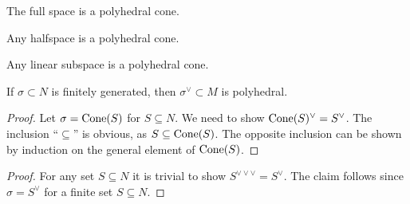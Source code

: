\begin{proposition}
  \label{all-polyhedral-cone}
  The full space is a polyhedral cone.
\end{proposition}

\begin{proposition}
  \label{halfspace-polyhedral-cone}
  Any halfspace is a polyhedral cone.
\end{proposition}

\begin{proposition}
  \label{linear-subspace-polyhedral-cone}
  Any linear subspace is a polyhedral cone.
\end{proposition}


\begin{proposition}
  \label{dual-polyhedral}
  \leanok
  If \( \sigma \subset N \) is finitely generated, then \( \sigma^\vee
  \subset M \) is polyhedral.
\end{proposition}
\begin{proof}
  \uses{}
  Let \( \sigma = \operatorname{Cone}(S) \) for \( S \subseteq N \). We need to show
  \( \operatorname{Cone}(S)^\vee = S^\vee \). The inclusion ``\( \subseteq \)'' is
  obvious, as \( S \subseteq \operatorname{Cone}(S) \). The opposite inclusion can
  be shown by induction on the general element of \( \operatorname{Cone}(S) \).
\end{proof}

\begin{proof}
  \uses{}
  For any set \( S \subseteq N \) it is trivial to show \(
  S^{\vee\vee\vee} = S^{\vee} \). The claim follows since \( \sigma =
  S^{\vee} \) for a finite set \( S \subseteq N \).
\end{proof}


